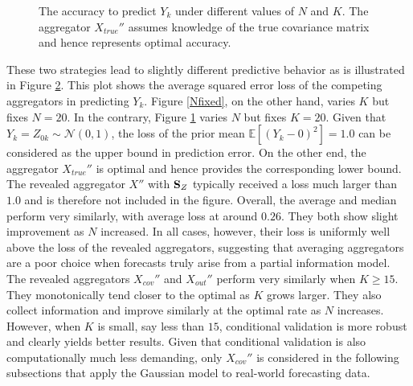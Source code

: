 \documentclass[11pt]{article}
\newcommand{\E}{\mathbb{E}}
\theoremstyle{definition}
\theoremstyle{definition}
\def\SS{{\bf S}}
\def\E{{\mathbb E}}
\begin{document}
\begin{figure}[t!]
\begin{subfigure}{0.5\textwidth}
                                \label{Kfixed}
        \end{subfigure}
         \caption{The accuracy to predict $Y_k$ under different values of $N$ and $K$. The aggregator $X_{true}''$ assumes knowledge of the true covariance matrix and hence represents  optimal accuracy.}
        \label{XEstimation}
\end{figure}





These two strategies lead to slightly different predictive behavior as is illustrated in Figure \ref{XEstimation}. This plot shows the average squared error loss of the competing aggregators in predicting $Y_k$. Figure \ref{Nfixed}, on the other hand, varies $K$ but fixes $N = 20$. In the contrary, Figure \ref{Kfixed}  varies $N$ but fixes $K = 20$. Given that $Y_k = Z_{0k} \sim \mathcal{N}(0,1)$, the loss of the prior mean $\E[(Y_k-0)^2] = 1.0$ can be considered as the upper bound in prediction error. On the other end, the aggregator $X_{true}''$ is optimal and hence provides the corresponding lower bound. The revealed aggregator $X''$ with $\SS_Z$ typically received a loss much larger than $1.0$ and is therefore not included in the figure. Overall, the average and median perform very similarly, with average loss at around $0.26$. They both show slight improvement as $N$ increased. In all cases, however, their loss is uniformly well above the loss of the revealed aggregators, suggesting that averaging aggregators are a poor choice when forecasts truly arise from a partial information model. The revealed aggregators $X_{cov}''$ and $X_{out}''$ perform very similarly when $K \geq 15$. They monotonically tend closer to the optimal as $K$ grows larger. They also collect information and improve similarly at the optimal rate as $N$ increases. However, when $K$ is small, say less than $15$, conditional validation is more robust and clearly yields better results. Given that conditional validation is also computationally much less demanding, only $X_{cov}''$ is considered in the following subsections that apply the Gaussian model to real-world forecasting data. 
  



\end{document}
